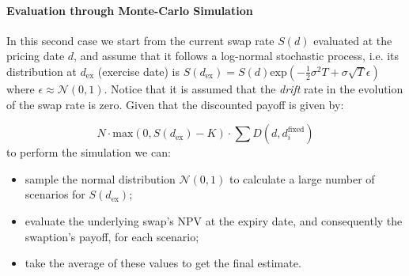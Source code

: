 \paragraph{Evaluation through Monte-Carlo Simulation}\label{evaluation-through-monte-carlo-simulation}

In this second case we start from the current swap rate \(S(d)\)
evaluated at the pricing date \(d\), and assume that it follows a
log-normal stochastic process, i.e. its distribution at
\(d_{\mathrm{ex}}\) (exercise date) is
\(S(d_{\mathrm{ex}}) = S(d)\mathrm{exp}(-\frac{1}{2}\sigma^{2}T+\sigma\sqrt{T}\epsilon)\)
where \(\epsilon\approx\mathcal{N}(0,1)\). Notice that it is assumed
that the \emph{drift} rate in the evolution of the swap rate is zero.
Given that the discounted payoff is given by:

\[N\cdot \mathrm{max}(0, S(d_{\mathrm{ex}}) - K)\cdot\sum D(d, d_i^{\mathrm{fixed}})\]
to perform the simulation we can:

\begin{itemize}
\tightlist
\item
  sample the normal distribution \(\mathcal{N}(0, 1)\) to calculate a
  large number of scenarios for \(S(d_{\mathrm{ex}})\);
\item
  evaluate the underlying swap's NPV at the expiry date, and
  consequently the swaption's payoff, for each scenario;
\item
  take the average of these values to get the final estimate.
\end{itemize}

